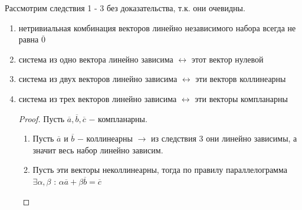 \begin{corollary}
	Рассмотрим следствия 1 - 3 без доказательства, т.к. они очевидны.\\
	\begin{enumerate}
		\item нетривиальная комбинация векторов линейно независимого набора всегда не равна $\overline{0}$
		\item система из одно вектора линейно зависима $\longleftrightarrow$ этот вектор нулевой
		\item система из двух векторов линейно зависима $\longleftrightarrow$ эти векторв коллинеарны
		\item система из трех векторов линейно зависима $\longleftrightarrow$ эти векторы компланарны
		\begin{proof}
			Пусть $\overline{a}, \overline{b}, \overline{c}$ $-$ компланарны.
			\begin{enumerate}
				\item Пусть $\overline{a}$ и $\overline{b}$ $-$ коллинеарны $\longrightarrow$ из следствия 3 они линейно зависимы, а значит весь набор линейно зависим.
				\item Пусть эти векторы неколлинеарны, тогда по правилу параллелограмма $\exists\alpha, \beta$ : $\alpha\overline{a}+\beta\overline{b}=\overline{c}$
			\end{enumerate}
		\end{proof}
		

\end{enumerate}
\end{corollary}
